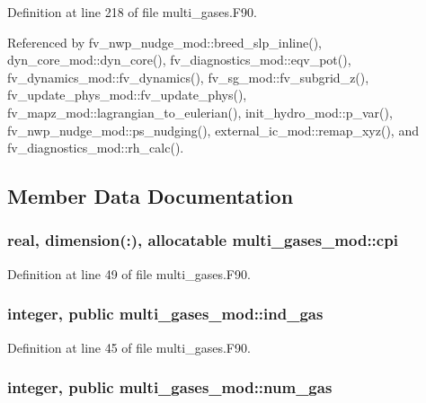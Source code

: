 Definition at line 218 of file multi\-\_\-gases.\-F90.



Referenced by fv\-\_\-nwp\-\_\-nudge\-\_\-mod\-::breed\-\_\-slp\-\_\-inline(), dyn\-\_\-core\-\_\-mod\-::dyn\-\_\-core(), fv\-\_\-diagnostics\-\_\-mod\-::eqv\-\_\-pot(), fv\-\_\-dynamics\-\_\-mod\-::fv\-\_\-dynamics(), fv\-\_\-sg\-\_\-mod\-::fv\-\_\-subgrid\-\_\-z(), fv\-\_\-update\-\_\-phys\-\_\-mod\-::fv\-\_\-update\-\_\-phys(), fv\-\_\-mapz\-\_\-mod\-::lagrangian\-\_\-to\-\_\-eulerian(), init\-\_\-hydro\-\_\-mod\-::p\-\_\-var(), fv\-\_\-nwp\-\_\-nudge\-\_\-mod\-::ps\-\_\-nudging(), external\-\_\-ic\-\_\-mod\-::remap\-\_\-xyz(), and fv\-\_\-diagnostics\-\_\-mod\-::rh\-\_\-calc().



\subsection{Member Data Documentation}
\subsubsection[{cpi}]{\setlength{\rightskip}{0pt plus 5cm}real, dimension(\-:), allocatable multi\-\_\-gases\-\_\-mod\-::cpi}\label{classmulti__gases__mod_a85983a7159ef293fa1c2d65647a66400}


Definition at line 49 of file multi\-\_\-gases.\-F90.

\subsubsection[{ind\-\_\-gas}]{\setlength{\rightskip}{0pt plus 5cm}integer, public multi\-\_\-gases\-\_\-mod\-::ind\-\_\-gas}\label{classmulti__gases__mod_a15e4b81a202b85b77802dce9c489b1a9}


Definition at line 45 of file multi\-\_\-gases.\-F90.

\subsubsection[{num\-\_\-gas}]{\setlength{\rightskip}{0pt plus 5cm}integer, public multi\-\_\-gases\-\_\-mod\-::num\-\_\-gas}\label{classmulti__gases__mod_ada7f0ffe52c60fbe7f6cafd04490c4d8}


